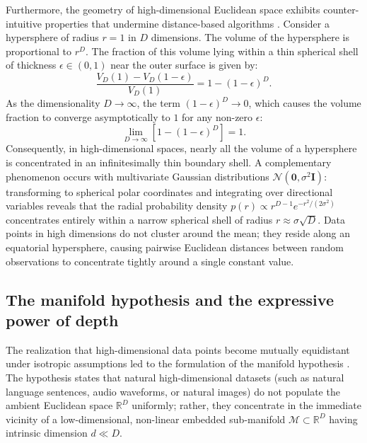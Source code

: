 \documentclass[../../../main.tex]{subfiles}
\begin{document}
Furthermore, the geometry of high-dimensional Euclidean space exhibits counter-intuitive properties that undermine distance-based algorithms \citep{bishop2024deep}. Consider a hypersphere of radius $r = 1$ in $D$ dimensions. The volume of the hypersphere is proportional to $r^D$. The fraction of this volume lying within a thin spherical shell of thickness $\epsilon \in (0, 1)$ near the outer surface is given by:
\begin{equation}
\frac{V_D(1) - V_D(1 - \epsilon)}{V_D(1)} = 1 - (1 - \epsilon)^D.
\end{equation}
As the dimensionality $D \to \infty$, the term $(1 - \epsilon)^D \to 0$, which causes the volume fraction to converge asymptotically to $1$ for any non-zero $\epsilon$:
\begin{equation}
\lim_{D \to \infty} \left[ 1 - (1 - \epsilon)^D \right] = 1.
\end{equation}
Consequently, in high-dimensional spaces, nearly all the volume of a hypersphere is concentrated in an infinitesimally thin boundary shell. A complementary phenomenon occurs with multivariate Gaussian distributions $\mathcal{N}(\mathbf{0}, \sigma^2 \mathbf{I})$: transforming to spherical polar coordinates and integrating over directional variables reveals that the radial probability density $p(r) \propto r^{D-1} e^{-r^2 / (2\sigma^2)}$ concentrates entirely within a narrow spherical shell of radius $r \approx \sigma \sqrt{D}$. Data points in high dimensions do not cluster around the mean; they reside along an equatorial hypersphere, causing pairwise Euclidean distances between random observations to concentrate tightly around a single constant value.

\subsection{The manifold hypothesis and the expressive power of depth}
\label{subsec:manifold_hypothesis_depth}

The realization that high-dimensional data points become mutually equidistant under isotropic assumptions led to the formulation of the manifold hypothesis \citep{bishop2024deep,goodfellow2016}. The hypothesis states that natural high-dimensional datasets (such as natural language sentences, audio waveforms, or natural images) do not populate the ambient Euclidean space $\mathbb{R}^D$ uniformly; rather, they concentrate in the immediate vicinity of a low-dimensional, non-linear embedded sub-manifold $\mathcal{M} \subset \mathbb{R}^D$ having intrinsic dimension $d \ll D$.
\end{document}
